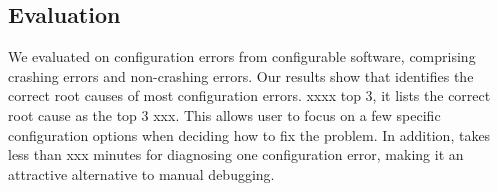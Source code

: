 







 









\subsection{Evaluation}

We evaluated \ourtool on \errors configuration errors
from \subjectnum configurable software, comprising
\crash crashing errors and \noncrash non-crashing errors.
Our results show that \ourtool identifies the correct
root causes of most configuration errors. xxxx top 3,
it lists the correct root cause as the top 3 xxx.
This allows \ourtool user to focus on a few specific configuration
options when deciding how to fix the problem. 
In addition, \ourtool takes less than xxx minutes for diagnosing
one configuration error, making it an attractive alternative
to manual debugging.

